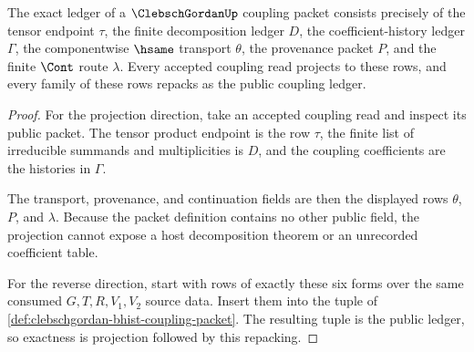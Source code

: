 \begin{theorem}
\label{thm:clebschgordan-ledger-exactness-obligation}
The exact ledger of a $\ClebschGordanUp$ coupling packet consists precisely
of the tensor endpoint $\tau$, the finite decomposition ledger $D$, the
coefficient-history ledger $\Gamma$, the componentwise $\hsame$ transport
$\theta$, the provenance packet $P$, and the finite $\Cont$ route $\lambda$.
Every accepted coupling read projects to these rows, and every family of
these rows repacks as the public coupling ledger.
\end{theorem}
\begin{proof}
For the projection direction, take an accepted coupling read and inspect its
public packet. The tensor product endpoint is the row $\tau$, the finite list
of irreducible summands and multiplicities is $D$, and the coupling
coefficients are the histories in $\Gamma$.

The transport, provenance, and continuation fields are then the displayed
rows $\theta$, $P$, and $\lambda$. Because the packet definition contains no
other public field, the projection cannot expose a host decomposition theorem
or an unrecorded coefficient table.

For the reverse direction, start with rows of exactly these six forms over
the same consumed $G,T,R,V_{1},V_{2}$ source data. Insert them into the tuple
of \autoref{def:clebschgordan-bhist-coupling-packet}. The resulting tuple is
the public ledger, so exactness is projection followed by this repacking.
\end{proof}

